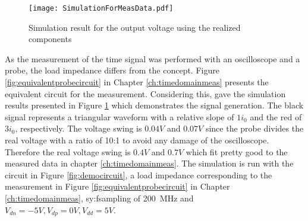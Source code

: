 \begin{figure}[htb!]
	\centering
  \texttt{[image: SimulationForMeasData.pdf]}
	\caption{Simulation result for the output voltage using the realized components}
	\label{fig:sim}
\end{figure}

As the measurement of the time signal was performed with an oscilloscope and a probe, the load impedance differs from the concept.
Figure \ref{fig:equivalentprobecircuit} in Chapter \ref{ch:timedomainmeas} presents the equivalent circuit for the measurement.
Considering this, gave the simulation results presented in Figure \ref{fig:sim} which demonstrates the signal generation.
The black signal represents a triangular waveform with a relative slope of $1 i_0$ and the red of $3 i_0$, respectively.
The voltage swing is $0.04 V$ and $0.07 V$ since the probe divides the real voltage with a ratio of 10:1 to avoid any damage of the oscilloscope.
Therefore the real voltage swing is $0.4 V$ and $0.7V$ which fit pretty good to the measured data in chapter \ref{ch:timedomainmeas}.
The simulation is run with the circuit in Figure \ref{fig:democircuit}, a load impedance corresponding to the measurement in Figure \ref{fig:equivalentprobecircuit} in Chapter \ref{ch:timedomainmeas}, \gls{sy:fsampling} of \SI{200}{\mega \hertz} and $V_{dn} = -5V, V_{dp} = 0V, V_{dd} = 5V$.

\newpage
